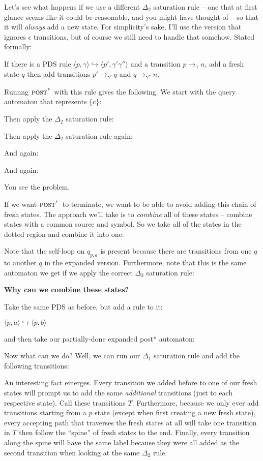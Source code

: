 \documentclass{article}
\newcommand{\Config}[2]{\ensuremath{\langle #1, #2 \rangle}}
\newcommand{\Rule}[2]{\ensuremath{#1 \hookrightarrow #2}}
\newcommand{\Trans}[3]{\ensuremath{#1 \rightarrow_{#2} #3}}
\newcommand{\subsubsubsection}[1]{\textbf{#1}}
\newcommand{\poststar}{\ensuremath{\textsc{post}^\textsc{*}}}
\begin{document}
Let's see what happens if we use a different $\Delta_2$ saturation
rule -- one that at first glance seems like it could be reasonable,
and you might have thought of -- so that it will \emph{always} add a
new state. For simplicity's sake, I'll use the version that ignores
$\epsilon$ transitions, but of course we still need to handle that
somehow. Stated formally:

   If there is a PDS rule
   \Rule{\Config{p}{\gamma}}{\Config{p'}{\gamma'\gamma''}} and a
   transition \Trans{p}{\gamma}{n}, add a fresh state $q$ then add
   transitions \Trans{p'}{\gamma'}{q} and \Trans{q}{\gamma''}{n}.

Runnng \poststar\ with this rule gives the following. We start with the
query automaton that represents $\{c\}$:

Then apply the $\Delta_2$ saturation rule:

Then apply the $\Delta_2$ saturation rule again:

And again:

And again:

You see the problem.

If we want \poststar\ to terminate, we want to be able to avoid adding
this chain of fresh states. The approach we'll take is to
\emph{combine} all of these states -- combine states with a common
source and symbol. So we take all of the states in the dotted region
and combine it into one:


Note that the self-loop on $q_{p,a}$ is present because there are
transitions from one $q$ to another $q$ in the expanded
version. Furthermore, note that this is the same automaton we get if
we apply the correct $\Delta_2$ saturation rule:


\subsubsubsection{Why can we combine these states?}

Take the same PDS as before, but add a rule to it:

    \Rule{\Config{p}{a}}{\Config{p}{b}}

and then take our partially-done expanded post* automaton:

Now what can we do? Well, we can run our $\Delta_1$ saturation rule
and add the following transitions:


An interesting fact emerges. Every transition we added before to one
of our fresh states will prompt us to add the same \emph{additional}
transitions (just to each respective state). Call these transitions
$T$.  Furthermore, because we only ever add transitions starting from
a $p$ state (except when first creating a new fresh state), every
accepting path that traverses the fresh states at all will take one
transition in $T$ then follow the ``spine'' of fresh states to the
end. Finally, every transition along the spine will have the same
label because they were all added as the second transition when
looking at the same $\Delta_2$ rule.
\end{document}
